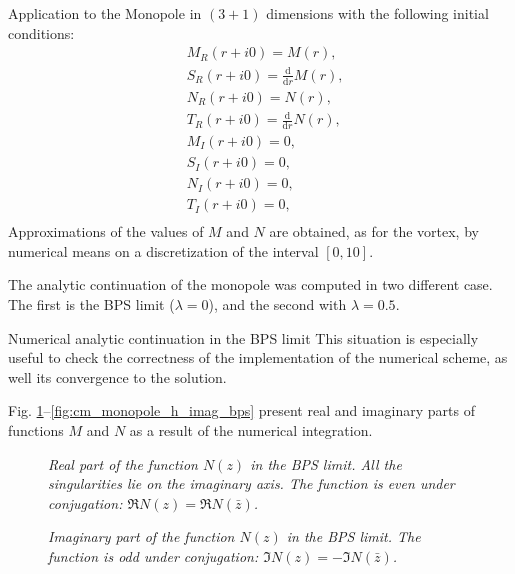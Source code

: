 \begin{section}{Application to the Monopole in $(3+1)$ dimensions}
  with the following initial conditions:
  \begin{align}
    &M_R(r+i0) = M(r),\\
    &S_R(r+i0) = \frac{\mathrm d}{\mathrm d r}M(r),\\
    &N_R(r+i0) = N(r),\\
    &T_R(r+i0) = \frac{\mathrm d}{\mathrm d r}N(r),\\
    &M_I(r+i0) = 0,\\
    &S_I(r+i0) = 0,\\
    &N_I(r+i0) = 0,\\
    &T_I(r+i0) = 0,\\
  \end{align}
  Approximations of the values of $M$ and $N$ are obtained, as for the
  vortex, by numerical means on a discretization of the interval
  $[0,10]$.

  The analytic continuation of the monopole was computed in two
  different case. The first is the BPS limit ($\lambda = 0$), and the
  second with $\lambda = 0.5$.
  \begin{subsection}{Numerical analytic continuation in the BPS limit}
    This situation is especially useful to check the correctness of
    the implementation of the numerical scheme, as well its
    convergence to the solution.

    Fig. \ref{fig:cm_monopole_f_real_bps}--\ref{fig:cm_monopole_h_imag_bps}
    present real and imaginary parts of functions $M$ and $N$ as a
    result of the numerical integration.

    \begin{figure}[!ht]
      \begin{center}
        
        \caption{\em Real part of the function $N(z)$ in the BPS
          limit. All the singularities lie on the imaginary axis. The
          function is even under conjugation: $\Re N(z) = \Re N(\bar
          z)$.}
        \label{fig:cm_monopole_f_real_bps}
      \end{center}
    \end{figure}

    \begin{figure}[!ht]
      \begin{center}
        
        \caption{\em Imaginary part of the function $N(z)$ in the BPS
          limit. The function is odd under conjugation: $\Im N(z) =
          -\Im N(\bar z)$.}
        \label{fig:cm_monopole_f_imag_bps}
      \end{center}
    \end{figure}


\end{subsection}
\end{section}
